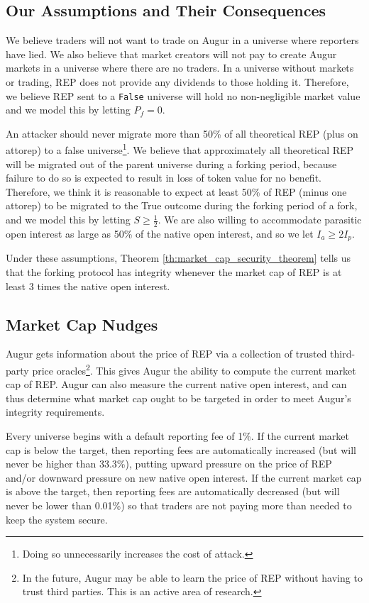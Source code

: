 \documentclass[floatfix,reprint,nofootinbib,amsmath,amssymb,epsfig,pre,floats,letterpaper,groupedaffiliation]{revtex4-1}
\theoremstyle{definition}
\theoremstyle{definition}
\begin{document}
\subsection{Our Assumptions and Their Consequences}

We believe traders will not want to trade on Augur in a universe where reporters have lied.  We also believe that market creators will not pay to create Augur markets in a universe where there are no traders.  In a universe without markets or trading, REP does not provide any dividends to those holding it.  Therefore, we believe REP sent to a \texttt{False} universe will hold no non-negligible market value and we model this by letting $P_f = 0$.

An attacker should never migrate more than 50\% of all theoretical REP (plus on attorep) to a false universe\footnote{Doing so unnecessarily increases the cost of attack.}. We believe that approximately all theoretical REP will be migrated out of the parent universe during a forking period, because failure to do so is expected to result in loss of token value for no benefit. Therefore, we think it is reasonable to expect at least 50\% of REP (minus one attorep) to be migrated to the True outcome during the forking period of a fork, and we model this by letting $S \geq \frac{1}{2}$.  We are also willing to accommodate parasitic open interest as large as 50\% of the native open interest, and so we let $I_a \geq 2 I_p$.

Under these assumptions, Theorem \ref{th:market_cap_security_theorem} tells us that the forking protocol has integrity whenever the market cap of REP is at least 3 times the native open interest.

\subsection{Market Cap Nudges}\label{section:market_cap_nudges}

Augur gets information about the price of REP via a collection of trusted third-party price oracles\footnote{In the future, Augur may be able to learn the price of REP without having to trust third parties. This is an active area of research.}.  This gives Augur the ability to compute the current market cap of REP.  Augur can also measure the current native open interest, and can thus determine what market cap ought to be targeted in order to meet Augur's integrity requirements.

Every universe begins with a default reporting fee of 1\%. If the current market cap is below the target, then reporting fees are automatically increased (but will never be higher than 33.3\%), putting upward pressure on the price of REP and/or downward pressure on new native open interest.  If the current market cap is above the target, then reporting fees are automatically decreased (but will never be lower than 0.01\%) so that traders are not paying more than needed to keep the system secure.
\end{document}
